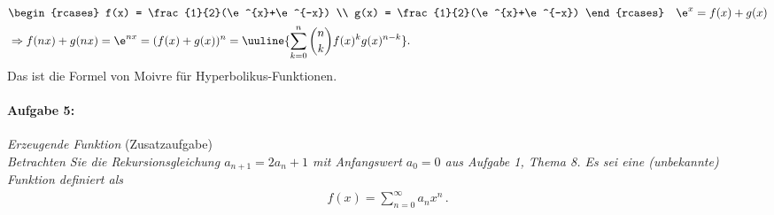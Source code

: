 \begin{enumerate}[label=(\alph*)]
\begin{align}
    &\begin{rcases}
        f(x) = \frac{1}{2}(\e^{x}+\e^{-x}) \\
        g(x) = \frac{1}{2}(\e^{x}+\e^{-x})
    \end{rcases} \quad \e^{x} = f(x) + g(x) \\
    &\Rightarrow f(nx) + g(nx) = \e^{nx} = (f(x) + g(x))^n = \uuline{\sum_{k=0}^n \binom{n}{k} f(x)^k g(x)^{n-k}}.
\end{align}
Das ist die Formel von Moivre für Hyperbolikus-Funktionen.
\end{enumerate}
%
\paragraph{Aufgabe 5: } \emph{Erzeugende Funktion} \hfill (Zusatzaufgabe)\\[0.2cm]
\emph{Betrachten Sie die Rekursionsgleichung $a_{n+1}=2a_n+1$ mit Anfangswert $a_0=0$ aus Aufgabe 1, Thema 8. Es sei eine (unbekannte) Funktion definiert als}
\begin{align*}
f(x)=\sum\limits_{n=0}^\infty a_n x^n\,.
\end{align*}
